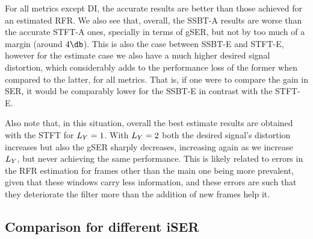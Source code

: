 For all metrics except DI, the accurate results are better than those achieved for an estimated RFR. We also see that, overall, the SSBT-A results are worse than the accurate STFT-A ones, specially in terms of gSER, but not by too much of a margin (around $4\dB$). This is also the case between SSBT-E and STFT-E, however for the estimate case we also have a much higher desired signal distortion, which considerably adds to the performance loss of the former when compared to the latter, for all metrics. That is, if one were to compare the gain in SER, it would be comparably lower for the SSBT-E in contrast with the STFT-E.

Also note that, in this situation, overall the best estimate results are obtained with the STFT for $\Ly = 1$. With $\Ly = 2$ both the desired signal's distortion increases but also the gSER sharply decreases, increasing again as we increase $\Ly$, but never achieving the same performance. This is likely related to errors in the RFR estimation for frames other than the main one being more prevalent, given that these windows carry less information, and these errors are such that they deteriorate the filter more than the addition of new frames help it.

\subsection{Comparison for different iSER}

